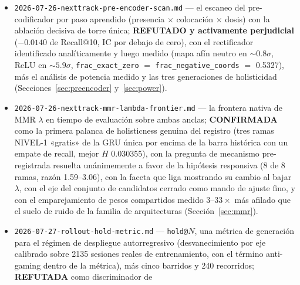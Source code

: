 \documentclass[11pt]{article}
\begin{document}
\begin{itemize}
    emparejamiento de vistas $\times$ profundidad de fusión en torre doble contra
    una torre única emparejada en parámetros al \SI{0.098}{\percent};
    \textbf{REFUTADO} (el cuarto nulo de combinador aprendido, y el que cierra la
    objeción de «entrenad la fusión de extremo a extremo»), mostrando que la vista
    de latentes crudos subsume a \texttt{delta}/\texttt{cummean}, que la cabeza
    MLP de fusión es activamente perjudicial, que la anchura de GRU única queda
    cerrada en PCA-192, y que holisticidad y recall están anticorrelacionados en
    todo el lote (Sección~\ref{sec:dualtower}).
  \item \texttt{2026-07-26-nexttrack-pre-encoder-scan.md} --- el escaneo del
    pre-codificador por paso aprendido (presencia $\times$ colocación $\times$
    dosis) con la ablación decisiva de torre única; \textbf{REFUTADO y activamente
    perjudicial} ($-\num{0.0140}$ de Recall@10, IC por debajo de cero), con el
    rectificador identificado analíticamente y luego medido (mapa afín neutro en
    ${\sim}0.8\sigma$, ReLU en ${\sim}5.9\sigma$, \texttt{frac\_exact\_zero} $=$
    \texttt{frac\_negative\_coords} $=$ \num{0.5327}), más el análisis de potencia
    medido y las tres generaciones de holisticidad
    (Secciones~\ref{sec:preencoder} y~\ref{sec:power}).
  \item \texttt{2026-07-26-nexttrack-mmr-lambda-frontier.md} --- la frontera
    nativa de MMR $\lambda$ en tiempo de evaluación sobre ambas anclas;
    \textbf{CONFIRMADA} como la primera palanca de holisticness genuina del
    registro (tres ramas NIVEL-1 «gratis» de la GRU única por encima de la barra
    histórica con un empate de recall, mejor $H$ \num{0.030355}), con la pregunta
    de mecanismo pre-registrada resuelta unánimemente a favor de la hipótesis
    responsiva (8 de 8 ramas, razón \numrange{1.59}{3.06}), con la faceta que liga
    mostrando su cambio al bajar $\lambda$, con el eje del conjunto de candidatos
    cerrado como mando de ajuste fino, y con el emparejamiento de pesos compartidos
    medido $\numrange{3}{33}\times$ más afilado que el suelo de ruido de la familia
    de arquitecturas (Sección~\ref{sec:mmr}).
  \item \texttt{2026-07-27-rollout-hold-metric.md} --- \texttt{hold@}$N$, una
    métrica de generación para el régimen de despliegue autorregresivo
    (desvanecimiento por eje calibrado sobre \num{2135} sesiones reales de
    entrenamiento, con el término anti-gaming dentro de la métrica), más cinco
    barridos y \num{240} recorridos; \textbf{REFUTADA} como discriminador de

\end{itemize}
\end{document}

